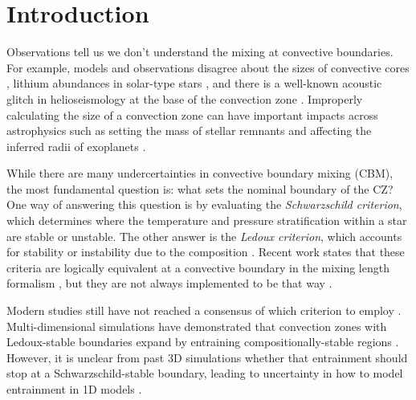 
\section{Introduction}
\label{sec:introduction}
Observations tell us we don't understand the mixing at convective boundaries.
For example, models and observations disagree about the sizes of convective cores \citep{claret_torres_2018, viani_basu_2020, pedersen_etal_2021}, lithium abundances in solar-type stars \citep{pinsonneault_1997, sestito_randich_2005, carlos_etal_2019, dumont_etal_2021}, and there is a well-known acoustic glitch in helioseismology at the base of the convection zone \citep[see][Sec.~7.2.1]{basu_2016}.
Improperly calculating the size of a convection zone can have important impacts across astrophysics such as setting the mass of stellar remnants \citep{farmer_etal_2019, mehta_etal_2022} and affecting the inferred radii of exoplanets \citep{basu_etal_2012, morrell_2020}.

While there are many undercertainties in convective boundary mixing (CBM), the most fundamental question is: what sets the nominal boundary of the CZ? 
One way of answering this question is by evaluating the \emph{Schwarzschild criterion}, which determines where the temperature and pressure stratification within a star are stable or unstable.
The other answer is the \emph{Ledoux criterion}, which accounts for stability or instability due to the composition \citep[e.g., the variation of helium abundance with pressure; see][chapter 3, for a nice review of these criteria]{salaris_cassisi_2017}.
Recent work states that these criteria are logically equivalent at a convective boundary in the mixing length formalism \citep{gabriel_etal_2014, mesa4, mesa5}, but they are not always implemented to be that way \citep[as in early versions of the MESA instrument,][]{mesa2}.

Modern studies still have not reached a consensus of which criterion to employ \citep[see][chapter 2, for a brief discussion]{kaiser_etal_2020}.
Multi-dimensional simulations have demonstrated that convection zones with Ledoux-stable boundaries expand by entraining compositionally-stable regions \citep{meakin_arnett_2007, woodward_etal_2015, jones_etal_2017, cristini_etal_2019, fuentes_cumming_2020, andrassy_etal_2020, andrassy_etal_2021}.
However, it is unclear from past 3D simulations whether that entrainment should stop at a Schwarzschild-stable boundary, leading to uncertainty in how to model entrainment in 1D models \citep{staritsin_2013, scott_etal_2021}.

